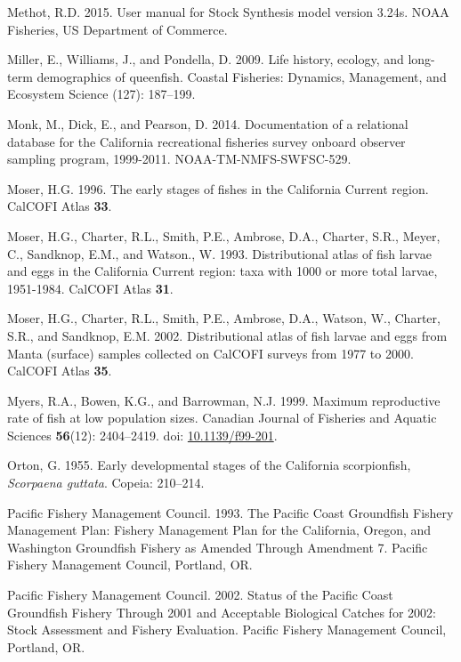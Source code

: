 \documentclass[12pt,]{article}
\begin{document}
\hypertarget{ref-Methot2015}{}
Methot, R.D. 2015. User manual for Stock Synthesis model version 3.24s.
NOAA Fisheries, US Department of Commerce.

\hypertarget{ref-Miller2009}{}
Miller, E., Williams, J., and Pondella, D. 2009. Life history, ecology,
and long-term demographics of queenfish. Coastal Fisheries: Dynamics,
Management, and Ecosystem Science (127): 187--199.

\hypertarget{ref-Monk2014}{}
Monk, M., Dick, E., and Pearson, D. 2014. Documentation of a relational
database for the California recreational fisheries survey onboard
observer sampling program, 1999-2011. NOAA-TM-NMFS-SWFSC-529.

\hypertarget{ref-Moser1996}{}
Moser, H.G. 1996. The early stages of fishes in the California Current
region. CalCOFI Atlas \textbf{33}.

\hypertarget{ref-Moser1993}{}
Moser, H.G., Charter, R.L., Smith, P.E., Ambrose, D.A., Charter, S.R.,
Meyer, C., Sandknop, E.M., and Watson., W. 1993. Distributional atlas of
fish larvae and eggs in the California Current region: taxa with 1000 or
more total larvae, 1951-1984. CalCOFI Atlas \textbf{31}.

\hypertarget{ref-Moser2002}{}
Moser, H.G., Charter, R.L., Smith, P.E., Ambrose, D.A., Watson, W.,
Charter, S.R., and Sandknop, E.M. 2002. Distributional atlas of fish
larvae and eggs from Manta (surface) samples collected on CalCOFI
surveys from 1977 to 2000. CalCOFI Atlas \textbf{35}.

\hypertarget{ref-Myers1999}{}
Myers, R.A., Bowen, K.G., and Barrowman, N.J. 1999. Maximum reproductive
rate of fish at low population sizes. Canadian Journal of Fisheries and
Aquatic Sciences \textbf{56}(12): 2404--2419. doi:
\href{https://doi.org/10.1139/f99-201}{10.1139/f99-201}.

\hypertarget{ref-Orton1955}{}
Orton, G. 1955. Early developmental stages of the California
scorpionfish, \emph{Scorpaena guttata}. Copeia: 210--214.

\hypertarget{ref-PFMC1993}{}
Pacific Fishery Management Council. 1993. The Pacific Coast Groundfish
Fishery Management Plan: Fishery Management Plan for the California,
Oregon, and Washington Groundfish Fishery as Amended Through Amendment
7. Pacific Fishery Management Council, Portland, OR.

\hypertarget{ref-PFMC2002}{}
Pacific Fishery Management Council. 2002. Status of the Pacific Coast
Groundfish Fishery Through 2001 and Acceptable Biological Catches for
2002: Stock Assessment and Fishery Evaluation. Pacific Fishery
Management Council, Portland, OR.
\end{document}

